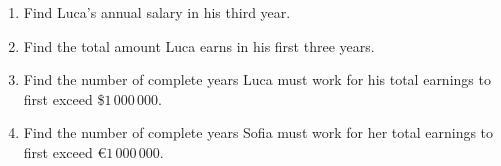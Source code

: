 \documentclass[12pt, twoside]{article}
\begin{document}
\begin{enumerate}[itemsep=0.15cm]
\begin{enumerate}[itemsep=0.1cm]
  \item Find Luca's annual salary in his third year.
  \item Find the total amount Luca earns in his first three years.
  \item Find the number of complete years Luca must work for his total
  earnings to first exceed \$$1\,000\,000$.
  \item Find the number of complete years Sofia must work for her total
  earnings to first exceed \euro$1\,000\,000$.
\end{enumerate}


\end{enumerate}
\end{document}
